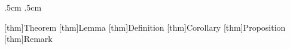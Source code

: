 \newcommand{\proofsymbol}{\Pisymbol{pzd}{113}}
\renewcommand{\qedsymbol}{$\blacksquare$}
\renewenvironment{proof}{{\vspace{0.5cm}\noindent \bfseries Proof:}}{\qedsymbol \vspace{0.5cm}}
\theorembodyfont{\small}
\newtheorem{pro}{Problem}[section]
\theorempreskipamount .5cm \theorempostskipamount .5cm
\theoremstyle{changeb} \theoremheaderfont{\color{Maroon}\sffamily\bfseries}
\theorembodyfont{\normalfont}
\newtheorem{thm}{Theorem}[chapter]
\newtheorem{theoremeT}[thm]{Theorem}
\newtheorem{defn}{Definition}
\newtheorem{prop}[thm]{Proposition}
\newtheorem{cor}[thm]{Corollary}
\newtheorem{df}[thm]{Definition}
\newtheorem{lem}[thm]{Lemma}
\newtheorem{axi}[thm]{Axiom}
\newtheorem{nota}[thm]{Notation}
\newtheorem{exa}[thm]{Example}
[thm]{Theorem}
[thm]{Lemma}
[thm]{Definition}
[thm]{Corollary}
[thm]{Proposition}
[thm]{Remark}
\newenvironment{solu}[0]{{\noindent \textbf{ Solution:}  \ }$\blacktriangleright$  }{$\blacktriangleleft$}

\newenvironment{rem}[0]{\begin{quote}{ }}{\end{quote}}

\makeatletter
\def\La{%
  L\kern-.36em{%
  \setbox0\hbox{T}%
  \vbox to\ht0{%
    \hbox{$\m@th$%
      \csname S@\f@size\endcsname
      \fontsize\sf@size\z@
      \math@fontsfalse\selectfont A}%
      \vss%
    }%
  }%
} \makeatother



\setcounter{tocdepth}{1}

